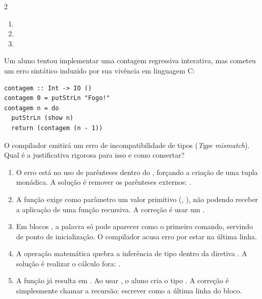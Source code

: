 \documentclass[a4paper,10pt,brazil]{article}
\begin{document}
\begin{multicols}{2}
\begin{enumerate}
  \item {}

  \item {}

  \item {}


\end{enumerate}

Um aluno tentou implementar uma contagem regressiva interativa, mas cometeu um erro sintático induzido por sua vivência em linguagem C:

\begin{verbatim}
contagem :: Int -> IO ()
contagem 0 = putStrLn "Fogo!"
contagem n = do
  putStrLn (show n)
  return (contagem (n - 1))
\end{verbatim}

O compilador emitirá um erro de incompatibilidade de tipos (\emph{Type mismatch}). Qual é a justificativa rigorosa para isso e como consertar?

\begin{enumerate}
  \item O erro está no uso de parênteses dentro do , forçando a criação de uma tupla monádica. A solução é remover os parênteses externos: .

  \item A função  exige como parâmetro um valor primitivo (, ), não podendo receber a aplicação de uma função recursiva. A correção é usar um .

  \item Em blocos , a palavra  só pode aparecer como o primeiro comando, servindo de ponto de inicialização. O compilador acusa erro por estar na última linha.

  \item A operação matemática  quebra a inferência de tipo dentro da diretiva . A solução é realizar o cálculo fora: .
  \item A função  já resulta em . Ao usar , o aluno cria o tipo . A correção é simplesmente chamar a recursão: escrever  como a última linha do bloco.



\end{enumerate}
\end{multicols}
\end{document}
